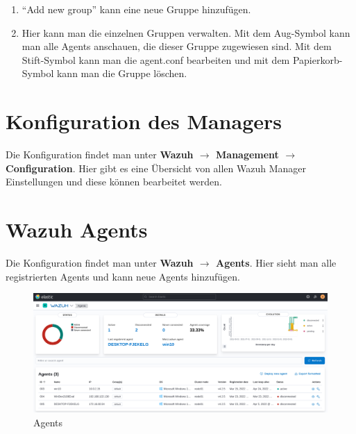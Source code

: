 \begin{enumerate}
    \item ``Add new group'' kann eine neue Gruppe hinzufügen.
    \item Hier kann man die einzelnen Gruppen verwalten. Mit dem Aug-Symbol kann man alle Agents anschauen, die dieser Gruppe zugewiesen sind. Mit dem Stift-Symbol kann man die agent.conf bearbeiten und mit dem Papierkorb-Symbol kann man die Gruppe löschen. 
\end{enumerate}

\section{Konfiguration des Managers}
Die Konfiguration findet man unter \textbf{Wazuh $\rightarrow$ Management $\rightarrow$ Configuration}.
Hier gibt es eine Übersicht von allen Wazuh Manager Einstellungen und diese können bearbeitet werden.

\section{Wazuh Agents}
Die Konfiguration findet man unter \textbf{Wazuh $\rightarrow$ Agents}.
Hier sieht man alle registrierten Agents und kann neue Agents hinzufügen.

\begin{figure}[H]
    \centering
    \includegraphics[width=\linewidth]{../img/wazuh-agents.png}
    \caption{Agents}
\end{figure}

